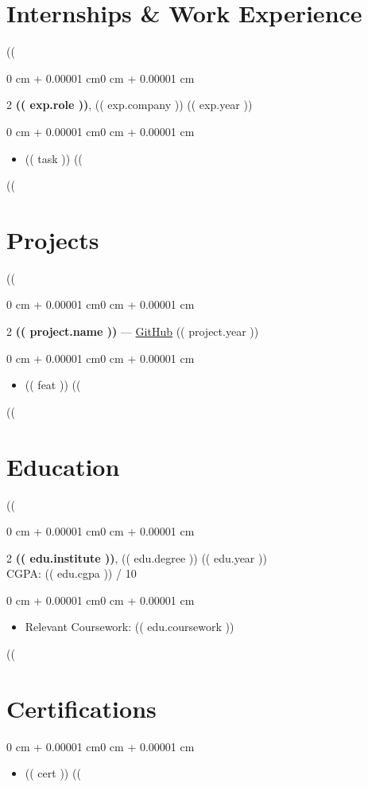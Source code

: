 \documentclass[10pt, letterpaper]{article}
\newenvironment{highlights}{
    \begin{itemize}[
        topsep=0.10 cm,
        parsep=0.10 cm,
        partopsep=0pt,
        itemsep=0pt,
        leftmargin=0 cm + 10pt
    ]
}{
    \end{itemize}
}
\newenvironment{highlightsforbulletentries}{
    \begin{itemize}[
        topsep=0.10 cm,
        parsep=0.10 cm,
        partopsep=0pt,
        itemsep=0pt,
        leftmargin=10pt
    ]
}{
    \end{itemize}
}
\newenvironment{onecolentry}{
    \begin{adjustwidth}{0 cm + 0.00001 cm}{0 cm + 0.00001 cm}
}{
    \end{adjustwidth}
}
\newenvironment{twocolentry}[2][]%
  {\onecolentry%
   \def\secondColumn{#2}%
   \setcolumnwidth{\fill, 4.5 cm}%
   \begin{paracol}{2}}%
  {\switchcolumn%
   \raggedleft%
   \secondColumn%
   \end{paracol}%
   \endonecolentry}
\begin{document}
\section{Internships \& Work Experience}
((%
\begin{twocolentry}{(( exp.year ))}
    \textbf{(( exp.role ))}, (( exp.company ))
\end{twocolentry}
\vspace{0.10cm}
\begin{onecolentry}
    \begin{highlights}
        ((%
            \item (( task ))
        ((%
    \end{highlights}
\end{onecolentry}
((%




\section{Projects}
((%
\begin{twocolentry}{(( project.year ))}  
    \textbf{(( project.name ))} — \href{(( project.link ))}{GitHub}
\end{twocolentry}
\vspace{0.10cm}
\begin{onecolentry}
    \begin{highlights}
        ((%
            \item (( feat ))
        ((%
    \end{highlights}
\end{onecolentry}
((%


\section{Education}
((%
\begin{twocolentry}{(( edu.year )) \\ CGPA: (( edu.cgpa )) / 10}
    \textbf{(( edu.institute ))}, (( edu.degree ))
\end{twocolentry}
\vspace{0.10cm}
\begin{onecolentry}
    \begin{highlights}
        \item Relevant Coursework: (( edu.coursework ))
    \end{highlights}
\end{onecolentry}
((%


\section{Certifications}
\begin{onecolentry}
    \begin{highlightsforbulletentries}
        ((%
            \item (( cert ))
        ((%
    \end{highlightsforbulletentries}
\end{onecolentry}
\end{document}
